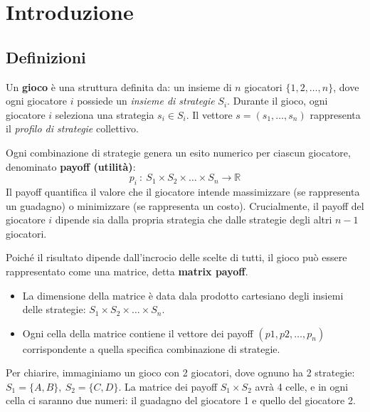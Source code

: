 \chapter{Introduzione}

\section{Definizioni}

\begin{definizione}[Gioco]
    Un \textbf{gioco} è una struttura definita da: un insieme di $n$ giocatori $\{1, 2, \dots, n\}$, dove ogni giocatore $i$ possiede un \textit{insieme di strategie} $S_i$. Durante il gioco, ogni giocatore $i$ seleziona una strategia $s_i \in S_i$. Il vettore $s = (s_1, \dots, s_n)$ rappresenta il \textit{profilo di strategie} collettivo.
\end{definizione}

\begin{definizione}[Payoff]
    Ogni combinazione di strategie genera un esito numerico per ciascun giocatore, denominato \textbf{payoff (utilità)}:
    \[
    p_i\ :\ S_1 \times S_2 \times \dots \times S_n \to \mathbb{R}
    \]
    Il payoff quantifica il valore che il giocatore intende massimizzare (se rappresenta un guadagno) o minimizzare (se rappresenta un costo). Crucialmente, il payoff del giocatore $i$ dipende sia dalla propria strategia che dalle strategie degli altri $n-1$ giocatori.
\end{definizione}

\begin{definizione}
    Poiché il risultato dipende dall'incrocio delle scelte di tutti, il gioco può essere rappresentato come una matrice, detta \textbf{matrix payoff}.
    \begin{itemize}
        \item La dimensione della matrice è data dala prodotto cartesiano degli insiemi delle strategie: $S_1 \times S_2 \times \dots \times S_n$.
        \item Ogni cella della matrice contiene il vettore dei payoff $(p1, p2, \dots, p_n)$ corrispondente a quella specifica combinazione di strategie.
    \end{itemize}
\end{definizione}

Per chiarire, immaginiamo un gioco con 2 giocatori, dove ognuno ha 2 strategie: $S_1 = \{A, B\},\ S_2 = \{C, D\}$. La matrice dei payoff $S_1 \times S_2$ avrà 4 celle, e in ogni cella ci saranno due numeri: il guadagno del giocatore 1 e quello del giocatore 2.

